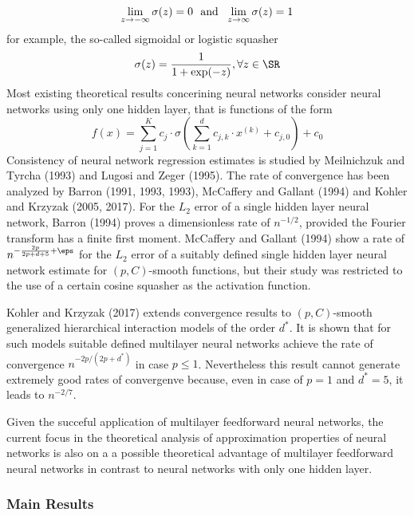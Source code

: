 \[\lim_{z\rightarrow-\infty} \sigma(z) = 0\hbox{ }\text{ and }\hbox{ }\lim_{z\rightarrow\infty} \sigma(z) = 1\]
for example, the so-called sigmoidal or logistic squasher 
\[\sigma(z) = \frac{1}{1 + \exp(-z)}, \forall z \in \SR\]
Most existing theoretical results concerining neural networks consider neural networks using only one hidden layer, that is functions of the form 
\begin{equation}
	\label{eq:DLNPR-4}
	f(x) = \sum_{j=1}^K c_j \cdot \sigma\left(\sum_{k=1}^d c_{j,k}\cdot x^{(k)} + c_{j,0}\right) + c_0
\end{equation}
Consistency of neural network regression estimates is studied by Meilnichzuk and Tyrcha (1993) and Lugosi and Zeger (1995). The rate of convergence has been analyzed by Barron (1991, 1993, 1993), McCaffery and Gallant (1994) and Kohler and Krzyzak (2005, 2017). For the $L_2$ error of a single hidden layer neural network, Barron (1994) proves a dimensionless rate of $n^{-1/2}$, provided the Fourier transform has a finite first moment. McCaffery and Gallant (1994) show a rate of $n^{-\frac{2p}{2p + d + 5} + \eps}$ for the $L_2$ error of a suitably defined single hidden layer neural network estimate for $(p,C)$-smooth functions, but their study was restricted to the use of a certain cosine squasher as the activation function.

Kohler and Krzyzak (2017) extends convergence results to $(p,C)$-smooth generalized hierarchical interaction models of the order $d^*$. It is shown that for such models suitable defined multilayer neural networks achieve the rate of convergence $n^{-2p/(2p+d^*)}$ in case $p\leq 1$. Nevertheless this result cannot generate extremely good rates of convergenve because, even in case of $p=1$ and $d^* = 5$, it leads to $n^{-2/7}$.

Given the succeful application of multilayer feedforward neural networks, the current focus in the theoretical analysis of approximation properties of neural networks is also on a a possible theoretical advantage of multilayer feedforward neural networks in contrast to neural networks with only one hidden layer. 

\subsubsection{Main Results}

